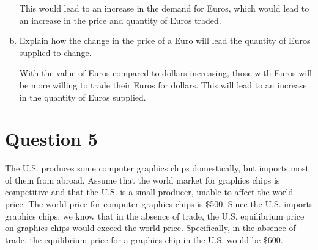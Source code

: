 \documentclass{article}
\newcommand{\question}[1]{\pagebreak\section{Question #1}}
\begin{document}
\begin{enumerate}[(a)]

    This would lead to an increase in the demand for Euros, which would lead to an increase in the price and quantity of Euros traded.

    \item Explain how the change in the price of a Euro will lead the quantity of Euros supplied to change.
    
    With the value of Euros compared to dollars increasing, those with Euros will be more willing to trade their Euros for dollars. This will lead to an increase in the quantity of Euros supplied.
\end{enumerate}

\pagebreak

\question{5}

The U.S. produces some computer graphics chips domestically, but
imports most of them from abroad. Assume that the world market for
graphics chips is competitive and that the U.S. is a small producer,
unable to affect the world price. The world price for computer graphics
chips is \$500. Since the U.S. imports graphics chips, we know that
in the absence of trade, the U.S. equilibrium price on graphics chips
would exceed the world price. Specifically, in the absence of trade, the
equilibrium price for a graphics chip in the U.S. would be \$600.
\end{document}
